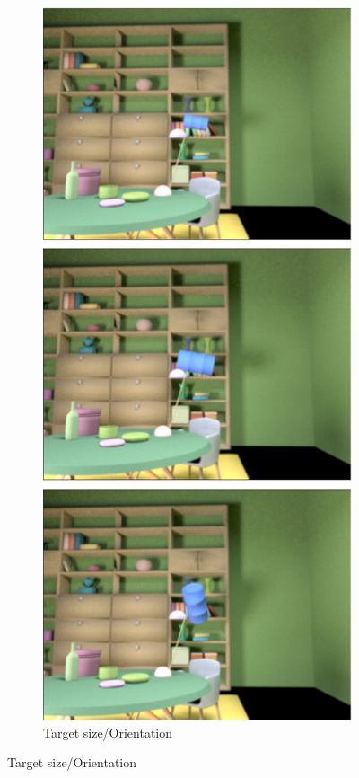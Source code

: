 \documentclass{jov}
\begin{document}
\begin{figure}
\begin{subfigure}{0.18 \textwidth}
        \label{fig:targetPositionVariation}
    \end{subfigure}
    ~
	\begin{subfigure}{0.18 \textwidth}
    \centering
        \caption{Target size/Orientation}
        \includegraphics[width=\textwidth]{../FiguresDraft5/Figure4/Figure4_b.pdf}

\end{subfigure}
\end{figure}
\end{document}
